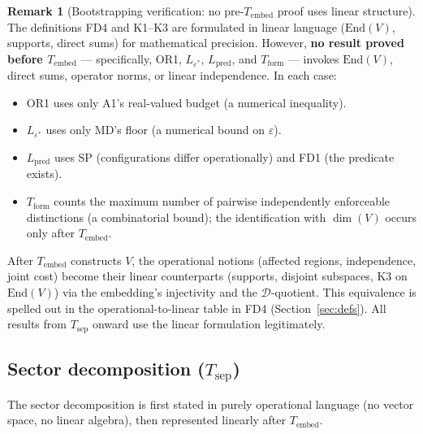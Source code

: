 \documentclass[11pt,a4paper]{article}
\theoremstyle{definition}
\newtheorem{remark}[theorem]{Remark}
\newcommand{\eps}{\varepsilon}
\newcommand{\End}{\mathrm{End}}
\begin{document}
\begin{remark}[Bootstrapping verification: no pre-$T_{\mathrm{embed}}$ proof uses linear structure]\label{rem:bootstrap_verify}
The definitions FD4 and K1--K3 are formulated in linear language ($\End(V)$, supports, direct sums) for mathematical precision.  However, \textbf{no result proved before $T_{\mathrm{embed}}$} --- specifically, OR1, $L_{\eps^*}$, $L_{\mathrm{pred}}$, and $T_{\mathrm{form}}$ --- invokes $\End(V)$, direct sums, operator norms, or linear independence.  In each case:
\begin{itemize}[nosep,leftmargin=2em,itemsep=2pt]
\item OR1 uses only A1's real-valued budget (a numerical inequality).
\item $L_{\eps^*}$ uses only MD's floor (a numerical bound on $\eps$).
\item $L_{\mathrm{pred}}$ uses SP (configurations differ operationally) and FD1 (the predicate exists).
\item $T_{\mathrm{form}}$ counts the maximum number of pairwise independently enforceable distinctions (a combinatorial bound); the identification with $\dim(V)$ occurs only after $T_{\mathrm{embed}}$.
\end{itemize}
After $T_{\mathrm{embed}}$ constructs $V$, the operational notions (affected regions, independence, joint cost) become their linear counterparts (supports, disjoint subspaces, K3 on $\End(V)$) via the embedding's injectivity and the $\mathcal{D}$-quotient.  This equivalence is spelled out in the operational-to-linear table in FD4 (Section~\ref{sec:defs}).  All results from $T_{\mathrm{sep}}$ onward use the linear formulation legitimately.
\end{remark}

\subsection{Sector decomposition ($T_{\mathrm{sep}}$)}

The sector decomposition is first stated in purely operational language (no vector space, no linear algebra), then represented linearly after $T_{\mathrm{embed}}$.
\end{document}
